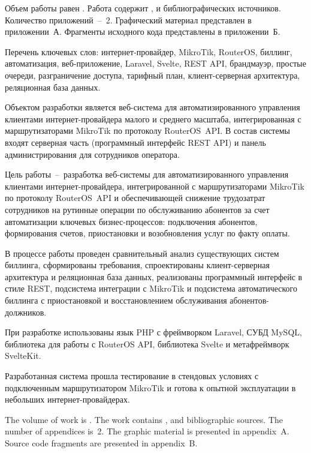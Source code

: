 
Объем работы равен . Работа содержит ,  и  библиографических источников. Количество приложений~--~2. Графический материал представлен в приложении~А. Фрагменты исходного кода представлены в приложении~Б.

Перечень ключевых слов: интернет-провайдер, MikroTik, RouterOS, биллинг, автоматизация, веб-приложение, Laravel, Svelte, REST API, брандмауэр, простые очереди, разграничение доступа, тарифный план, клиент-серверная архитектура, реляционная база данных.

Объектом разработки является веб-система для автоматизированного управления клиентами интернет-провайдера малого и среднего масштаба, интегрированная с маршрутизаторами MikroTik по протоколу RouterOS~API. В состав системы входят серверная часть (программный интерфейс REST API) и панель администрирования для сотрудников оператора.

Цель работы~--~разработка веб-системы для автоматизированного управления клиентами интернет-провайдера, интегрированной с маршрутизаторами MikroTik по протоколу RouterOS~API и обеспечивающей снижение трудозатрат сотрудников на рутинные операции по обслуживанию абонентов за счет автоматизации ключевых бизнес-процессов: подключения абонентов, формирования счетов, приостановки и возобновления услуг по факту оплаты.

В процессе работы проведен сравнительный анализ существующих систем биллинга, сформированы требования, спроектированы клиент-серверная архитектура и реляционная база данных, реализованы программный интерфейс в стиле REST, подсистема интеграции с MikroTik и подсистема автоматического биллинга с приостановкой и восстановлением обслуживания абонентов-должников.

При разработке использованы язык PHP с фреймворком Laravel, СУБД MySQL, библиотека для работы с RouterOS API, библиотека Svelte и метафреймворк SvelteKit.

Разработанная система прошла тестирование в стендовых условиях с подключенным маршрутизатором MikroTik и готова к опытной эксплуатации в небольших интернет-провайдерах.


The volume of work is . The work contains ,  and  bibliographic sources. The number of appendices is~2. The graphic material is presented in appendix~A. Source code fragments are presented in appendix~B.


